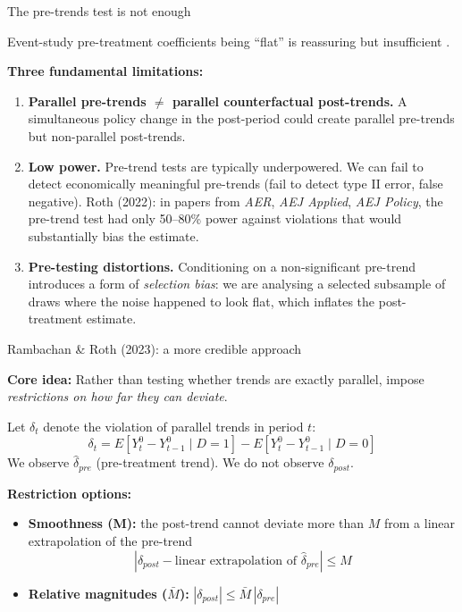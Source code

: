 \documentclass[aspectratio=169, 10pt]{beamer}
\begin{document}
\begin{frame}{The pre-trends test is not enough}

  Event-study pre-treatment coefficients being ``flat'' is reassuring but \alert{insufficient} \citep{roth2022pretest}.

  \medskip
  \textbf{Three fundamental limitations:}

  \begin{enumerate}
    \item \textbf{Parallel pre-trends $\neq$ parallel counterfactual post-trends.}
          A simultaneous policy change in the post-period could create parallel pre-trends
          but non-parallel post-trends.

    \item \textbf{Low power.}
          Pre-trend tests are typically underpowered. We can fail to detect economically meaningful
          pre-trends (fail to detect type II error, false negative). Roth (2022): in papers from \textit{AER}, \textit{AEJ Applied}, \textit{AEJ Policy},
          the pre-trend test had only 50--80\% power against violations that would substantially bias the estimate.

    \item \textbf{Pre-testing distortions.}
          Conditioning on a non-significant pre-trend introduces a form of \emph{selection bias}:
          we are analysing a selected subsample of draws where the noise happened to look flat,
          which inflates the post-treatment estimate.
  \end{enumerate}

\end{frame}

\begin{frame}{Rambachan \& Roth (2023): a more credible approach}

  \textbf{Core idea:} Rather than testing whether trends are exactly parallel, impose
  \emph{restrictions on how far they can deviate}.

  \medskip
  Let $\delta_t$ denote the violation of parallel trends in period $t$:
  \[
    \delta_t = E[Y_t^0 - Y_{t-1}^0 \mid D=1] - E[Y_t^0 - Y_{t-1}^0 \mid D=0]
  \]
  We observe $\hat\delta_{pre}$ (pre-treatment trend). We do not observe $\delta_{post}$.

  \medskip
  \textbf{Restriction options:}
  \begin{itemize}
    \item \textbf{Smoothness (M):} the post-trend cannot deviate more than $M$ from a linear
          extrapolation of the pre-trend
          \[ |\delta_{post} - \text{linear extrapolation of }\hat\delta_{pre}| \leq M \]
    \item \textbf{Relative magnitudes ($\bar M$):} $|\delta_{post}| \leq \bar M\,|\delta_{pre}|$
  \end{itemize}


\end{frame}
\end{document}
